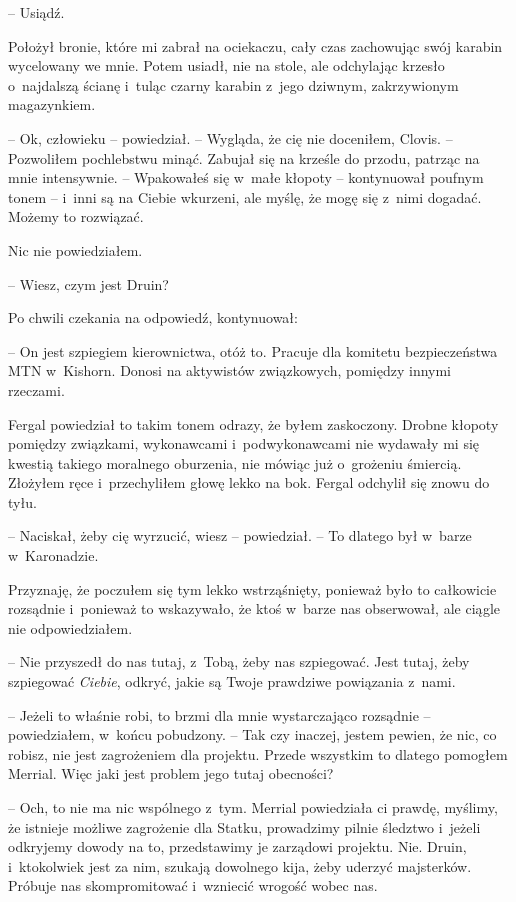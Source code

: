 \documentclass[oneside,polish,11pt,sfheadings]{mwbk}
\begin{document}
-- Usiądź.

Położył bronie, które mi zabrał na ociekaczu, cały czas zachowując swój
karabin wycelowany we mnie. Potem usiadł, nie na stole, ale odchylając
krzesło o~najdalszą ścianę i~tuląc czarny karabin z~jego dziwnym,
zakrzywionym magazynkiem.

-- Ok, człowieku -- powiedział. -- Wygląda, że cię nie doceniłem, Clovis. -- Pozwoliłem pochlebstwu minąć. Zabujał się na krześle do przodu, patrząc
na mnie intensywnie. -- Wpakowałeś się w~małe kłopoty -- kontynuował
poufnym tonem -- i~inni są na Ciebie wkurzeni, ale myślę, że mogę się z~nimi dogadać. Możemy to rozwiązać.

Nic nie powiedziałem.

-- Wiesz, czym jest Druin?

Po chwili czekania na odpowiedź, kontynuował: 

-- On jest szpiegiem
kierownictwa, otóż to. Pracuje dla komitetu bezpieczeństwa MTN w~Kishorn. Donosi na aktywistów związkowych, pomiędzy innymi rzeczami.

Fergal powiedział to takim tonem odrazy, że byłem zaskoczony. Drobne
kłopoty pomiędzy związkami, wykonawcami i~podwykonawcami nie wydawały mi
się kwestią takiego moralnego oburzenia, nie mówiąc już o~grożeniu
śmiercią. Złożyłem ręce i~przechyliłem głowę lekko na bok. Fergal
odchylił się znowu do tyłu.

-- Naciskał, żeby cię wyrzucić, wiesz -- powiedział. -- To dlatego był w~barze w~Karonadzie.

Przyznaję, że poczułem się tym lekko wstrząśnięty, ponieważ było to
całkowicie rozsądnie i~ponieważ to wskazywało, że ktoś w~barze nas
obserwował, ale ciągle nie odpowiedziałem.

-- Nie przyszedł do nas tutaj, z~Tobą, żeby nas szpiegować. Jest tutaj,
żeby szpiegować \textit{Ciebie}, odkryć, jakie są Twoje prawdziwe
powiązania z~nami.

-- Jeżeli to właśnie robi, to brzmi dla mnie wystarczająco rozsądnie -- powiedziałem, w~końcu pobudzony. -- Tak czy inaczej, jestem pewien, że
nic, co robisz, nie jest zagrożeniem dla projektu. Przede wszystkim to
dlatego pomogłem Merrial. Więc jaki jest problem jego tutaj obecności?

-- Och, to nie ma nic wspólnego z~tym. Merrial powiedziała ci prawdę,
myślimy, że istnieje możliwe zagrożenie dla Statku, prowadzimy pilnie
śledztwo i~jeżeli odkryjemy dowody na to, przedstawimy je zarządowi
projektu. Nie. Druin, i~ktokolwiek jest za nim, szukają dowolnego kija,
żeby uderzyć majsterków. Próbuje nas skompromitować i~wzniecić wrogość
wobec nas.
\end{document}
